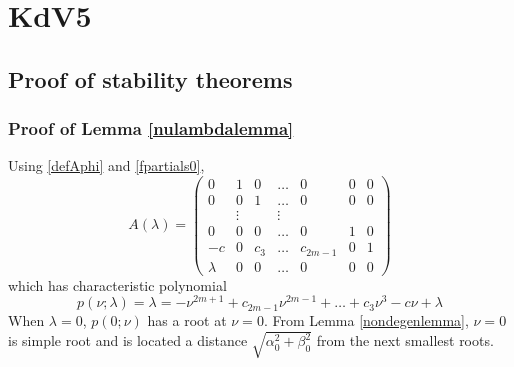 \documentclass[thesis.tex]{subfiles}
\begin{document}
\iffulldocument\else
	\chapter{KdV5}
\fi

\section{Proof of stability theorems} 

\subsection{Proof of Lemma \ref{nulambdalemma}}

Using \eqref{defAphi} and \eqref{fpartials0},
\begin{equation}\label{Alambdaform}
A(\lambda) = 
\begin{pmatrix}
0 & 1 & 0 & \dots & 0 & 0 & 0 \\
0 & 0 & 1 & \dots & 0 & 0 & 0\\
& \vdots && \vdots \\
0 & 0 & 0 & \dots & 0 & 1 & 0 \\
- c & 0 & c_3 & \dots & c_{2m-1} & 0 & 1 \\
\lambda & 0 & 0 & \dots & 0 & 0 & 0
\end{pmatrix}
\end{equation}
which has characteristic polynomial
\begin{equation}\label{charpolyA0lambda}
p(\nu; \lambda) = \lambda = -\nu^{2m+1} + c_{2m-1} \nu^{2m-1} + \dots + c_3 \nu^3 - c \nu + \lambda
\end{equation}
When $\lambda = 0$, $p(0; \nu)$ has a root at $\nu = 0$. From Lemma \ref{nondegenlemma}, $\nu = 0$ is simple root and is located a distance $\sqrt{\alpha_0^2 + \beta_0^2}$ from the next smallest roots. 
\end{document}
